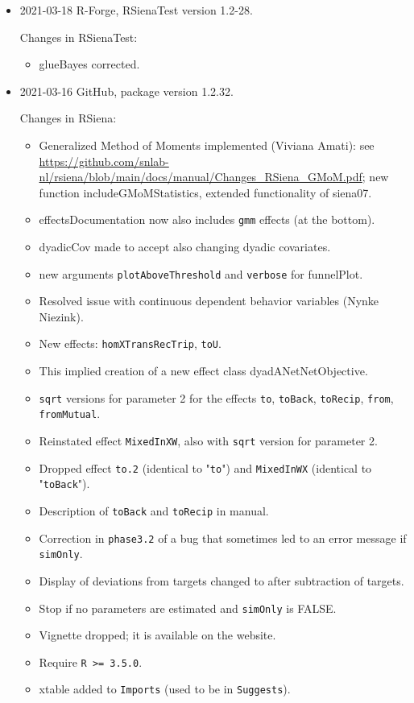 \documentclass[a4paper,fleqn,11pt]{article}
\newcommand{\+}{\, + \,}
\newcommand{\sfn}[1]{\textsf{#1}}
\begin{document}
\begin{small}
\begin{itemize}
\item 2021-03-18  R-Forge, \sfn{RSienaTest} version 1.2-28.

Changes in RSienaTest:
\begin{itemize}
\item \sfn{glueBayes} corrected.
\end{itemize}

\item 2021-03-16  GitHub, package version 1.2.32.

Changes in RSiena:
\begin{itemize}
   \item Generalized Method of Moments implemented (Viviana Amati):
     see\\
     \url{https://github.com/snlab-nl/rsiena/blob/main/docs/manual/Changes_RSiena_GMoM.pdf};
     new function \sfn{includeGMoMStatistics}, extended functionality of \sfn{siena07}.
   \item \sfn{effectsDocumentation} now also includes \texttt{gmm} effects (at the bottom).
   \item \sfn{dyadicCov} made to accept also changing dyadic covariates.
   \item new arguments \texttt{plotAboveThreshold} and \texttt{verbose} for \sfn{funnelPlot}.
   \item Resolved issue with continuous dependent behavior variables
     (Nynke Niezink).
   \item New effects: \texttt{homXTransRecTrip}, \texttt{toU}.
   \item This implied creation of a new effect class \sfn{dyadANetNetObjective}.
   \item \texttt{sqrt} versions for parameter 2 for the effects
      \texttt{to}, \texttt{toBack}, \texttt{toRecip},
     \texttt{from}, \texttt{fromMutual}.
   \item Reinstated effect \texttt{MixedInXW}, also with \texttt{sqrt} version for parameter 2.
   \item Dropped effect \texttt{to.2} (identical to "\texttt{to}")
     and \texttt{MixedInWX} (identical to "\texttt{toBack}").
   \item Description of \texttt{toBack} and \texttt{toRecip} in manual.
   \item Correction in \texttt{phase3.2} of a bug that sometimes led to an error message
     if \texttt{simOnly}.
   \item Display of deviations from targets changed to after subtraction of targets.
   \item Stop if no parameters are estimated and \texttt{simOnly} is FALSE.
   \item Vignette dropped; it is available on the website.
   \item Require \texttt{R >= 3.5.0}.
   \item \sfn{xtable} added to \texttt{Imports} (used to be in \texttt{Suggests}).
\end{itemize}



\end{itemize}
\end{small}
\end{document}
